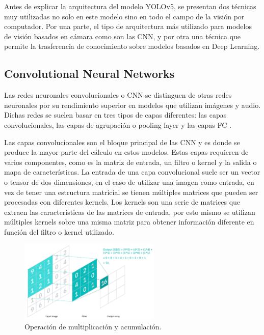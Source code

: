 Antes de explicar la arquitectura del modelo YOLOv5, se presentan dos técnicas muy utilizadas no solo en este modelo sino en todo el campo de la visión por computador. Por una parte, el tipo de arquitectura más utilizado para modelos de visión basados en cámara como son las \ac{CNN}, y por otra una técnica que permite la trasferencia de conocimiento sobre modelos basados en Deep Learning.

\subsection{Convolutional Neural Networks}
\label{sec:Convolutional Neural Networks}

Las redes neuronales convolucionales o \acl{CNN} se distinguen de otras redes neuronales por su rendimiento superior en modelos que utilizan imágenes y audio. Dichas redes se suelen basar en tres tipos de capas diferentes: las capas convolucionales, las capas de agrupación o pooling layer y las capas \acl{FC} \cite{what_cnn}.

Las capas convolucionales son el bloque principal de las \ac{CNN} y es donde se produce la mayor parte del cálculo en estos modelos. Estas capas requieren de varios componentes, como es la matriz de entrada, un filtro o kernel y la salida o mapa de características. La entrada de una capa convolucional suele ser un vector o tensor de dos dimensiones, en el caso de utilizar una imagen como entrada, en vez de tener una estructura matricial se tienen múltiples matrices que pueden ser procesadas con diferentes kernels. Los kernels son una serie de matrices que extraen las características de las matrices de entrada, por esto mismo se utilizan múltiples kernels sobre una misma matriz para obtener información diferente en función del filtro o kernel utilizado.

\begin{figure}[H]
    \centering
    \includegraphics[width=0.6\textwidth]{Book/figures/5_deteccion2d/cnns.png}
    \caption{Operación de multiplicación y acumulación.}
    \label{fig:Operación de multiplicación y acumulación.}
\end{figure}

